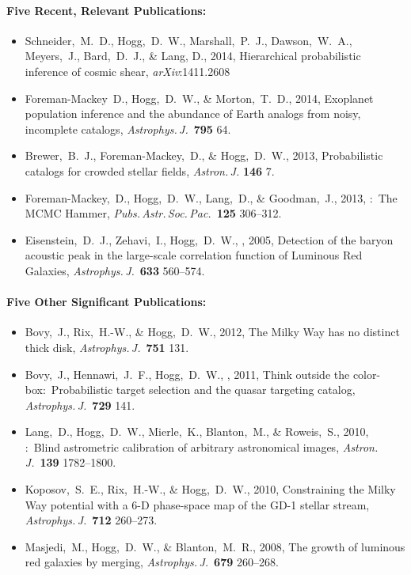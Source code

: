 \documentclass[12pt]{article}
\begin{document}
\paragraph{Five Recent, Relevant Publications:}
\begin{itemize}\setlength{\itemsep}{0pt}
\item
Schneider,~M.~D., Hogg,~D.~W., Marshall,~P.~J., Dawson,~W.~A., Meyers,~J., Bard,~D.~J., \& Lang, D., 2014,
{Hierarchical probabilistic inference of cosmic shear},
\textit{arXiv}:1411.2608
\item
Foreman-Mackey~D., Hogg,~D.~W., \& Morton,~T.~D., 2014,
{Exoplanet population inference and the abundance of Earth analogs from noisy, incomplete catalogs},
\textit{Astrophys.\,J.}\ \textbf{795} 64.
\item
Brewer,~B.~J., Foreman-Mackey,~D., \& Hogg,~D.~W., 2013,
{Probabilistic catalogs for crowded stellar fields},
\textit{Astron.\,J.} \textbf{146} 7.
\item
Foreman-Mackey,~D., Hogg,~D.~W., Lang,~D., \& Goodman,~J., 2013,
{:\ The MCMC Hammer},
\textit{Pubs.\,Astr.\,Soc.\,Pac.}\ \textbf{125} 306--312.
\item
Eisenstein,~D.~J., Zehavi,~I., Hogg,~D.~W., \etal, 2005,
{Detection of the baryon acoustic peak in the large-scale correlation function of  Luminous Red Galaxies},
\textit{Astrophys.\,J.}\ \textbf{633} 560--574.
\end{itemize}

\paragraph{Five Other Significant Publications:}
\begin{itemize}\setlength{\itemsep}{0pt}
\item
Bovy,~J., Rix,~H.-W., \& Hogg,~D.~W., 2012,
{The Milky Way has no distinct thick disk},
\textit{Astrophys.\,J.}\ \textbf{751} 131.
\item
Bovy,~J., Hennawi,~J.~F., Hogg,~D.~W., \etal, 2011,
{Think outside the color-box:\ Probabilistic target selection and the  quasar targeting catalog},
\textit{Astrophys.\,J.}\ \textbf{729} 141.
\item
Lang,~D., Hogg,~D.~W., Mierle,~K., Blanton,~M., \& Roweis,~S., 2010,
{:\ Blind astrometric calibration of arbitrary astronomical images},
\textit{Astron.\,J.}\ \textbf{139} 1782--1800.
\item
Koposov,~S.~E., Rix,~H.-W., \& Hogg,~D.~W., 2010,
{Constraining the Milky Way potential with a 6-D phase-space map of the GD-1 stellar stream},
\textit{Astrophys.\,J.}\ \textbf{712} 260--273.
\item
Masjedi,~M., Hogg,~D.~W., \& Blanton,~M.~R., 2008,
{The growth of luminous red galaxies by merging},
\textit{Astrophys.\,J.}\ \textbf{679} 260--268.
\end{itemize}
\end{document}
